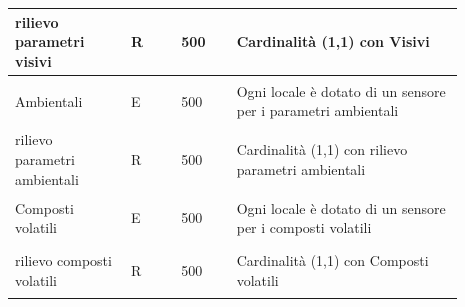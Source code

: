 \documentclass[12pt,a4paper]{article}
\begin{document}
\begin{center}
\begin{longtable}{|p{0.23\linewidth}|p{0.1\linewidth}|p{0.11\linewidth}|p{0.45\linewidth}|}
\hline
rilievo parametri visivi 				& \begin{center}
\vspace{-25pt}R
\end{center}
					& \begin{center}
					\vspace{-25pt}500\end{center}
					&  Cardinalità (1,1) con Visivi \\ 

\hline
Ambientali 				& \begin{center}
\vspace{-25pt}E
\end{center}
					& \begin{center}
					\vspace{-25pt}500\end{center}
					&  Ogni locale è dotato di un sensore per i parametri ambientali \\ 

\hline
rilievo parametri ambientali 				& \begin{center}
\vspace{-25pt}R
\end{center}
					& \begin{center}
					\vspace{-25pt}500\end{center}
					&  Cardinalità (1,1) con rilievo parametri ambientali \\ 

\hline
Composti volatili 				& \begin{center}
\vspace{-25pt}E
\end{center}
					& \begin{center}
					\vspace{-25pt}500\end{center}
					&  Ogni locale è dotato di un sensore per i composti volatili \\ 

\hline
rilievo composti volatili 				& \begin{center}
\vspace{-25pt}R
\end{center}
					& \begin{center}
					\vspace{-25pt}500\end{center}
					&  Cardinalità (1,1) con Composti volatili \\ 



\hline



\end{longtable}\end{center}
\end{document}
